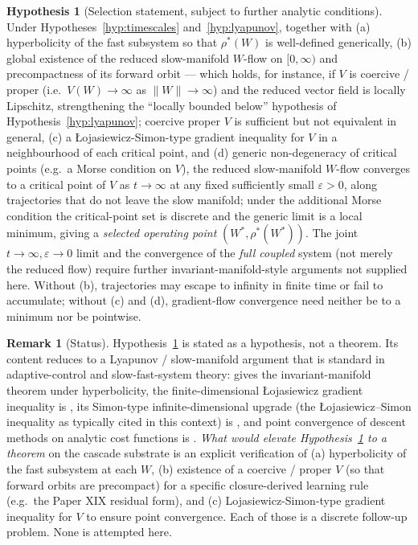 \documentclass[11pt]{article}
\theoremstyle{definition}
\newtheorem{remark}[theorem]{Remark}
\newtheorem{hypothesis}[theorem]{Hypothesis}
\begin{document}
\begin{hypothesis}[Selection statement, subject to further analytic conditions]\label{hyp:selection}
Under Hypotheses~\ref{hyp:timescales} and~\ref{hyp:lyapunov}, together with (a) hyperbolicity of the fast subsystem so that $\rho^*(W)$ is well-defined generically, (b) global existence of the reduced slow-manifold $W$-flow on $[0, \infty)$ and precompactness of its forward orbit --- which holds, for instance, if $V$ is coercive / proper (i.e.\ $V(W) \to \infty$ as $\|W\| \to \infty$) and the reduced vector field is locally Lipschitz, strengthening the ``locally bounded below'' hypothesis of Hypothesis~\ref{hyp:lyapunov}; coercive proper $V$ is sufficient but not equivalent in general, (c) a {\L}ojasiewicz-Simon-type gradient inequality for $V$ in a neighbourhood of each critical point, and (d) generic non-degeneracy of critical points (e.g.\ a Morse condition on $V$), the reduced slow-manifold $W$-flow converges to a critical point of $V$ as $t \to \infty$ at any fixed sufficiently small $\varepsilon > 0$, along trajectories that do not leave the slow manifold; under the additional Morse condition the critical-point set is discrete and the generic limit is a local minimum, giving a \emph{selected operating point} $(W^*, \rho^*(W^*))$. The joint $t \to \infty, \varepsilon \to 0$ limit and the convergence of the \emph{full coupled} system (not merely the reduced flow) require further invariant-manifold-style arguments not supplied here. Without (b), trajectories may escape to infinity in finite time or fail to accumulate; without (c) and (d), gradient-flow convergence need neither be to a minimum nor be pointwise.
\end{hypothesis}

\begin{remark}[Status]
Hypothesis~\ref{hyp:selection} is stated as a hypothesis, not a theorem. Its content reduces to a Lyapunov / slow-manifold argument that is standard in adaptive-control and slow-fast-system theory: \citep{Wiggins2003} gives the invariant-manifold theorem under hyperbolicity, the finite-dimensional {\L}ojasiewicz gradient inequality is \citep{Lojasiewicz1993}, its Simon-type infinite-dimensional upgrade (the {\L}ojasiewicz--Simon inequality as typically cited in this context) is \citep{Simon1983}, and point convergence of descent methods on analytic cost functions is \citep{AbsilMahonyAndrews2005}. \emph{What would elevate Hypothesis~\ref{hyp:selection} to a theorem} on the cascade substrate is an explicit verification of (a) hyperbolicity of the fast subsystem at each $W$, (b) existence of a coercive / proper $V$ (so that forward orbits are precompact) for a specific closure-derived learning rule (e.g.\ the Paper XIX residual form), and (c) Lojasiewicz-Simon-type gradient inequality for $V$ to ensure point convergence. Each of those is a discrete follow-up problem. None is attempted here.
\end{remark}
\end{document}
